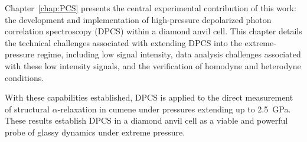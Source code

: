 Chapter~\ref{chap:PCS} presents the central experimental contribution of this work: the development and implementation of high-pressure depolarized photon correlation spectroscopy (DPCS) within a diamond anvil cell. This chapter details the technical challenges associated with extending DPCS into the extreme-pressure regime, including low signal intensity, data analysis challenges associated with these low intensity signals, and the verification of homodyne and heterodyne conditions. 

With these capabilities established, DPCS is applied to the direct measurement of structural $\alpha$-relaxation in cumene under pressures extending up to 2.5~GPa. These results establish DPCS in a diamond anvil cell as a viable and powerful probe of glassy dynamics under extreme pressure.
